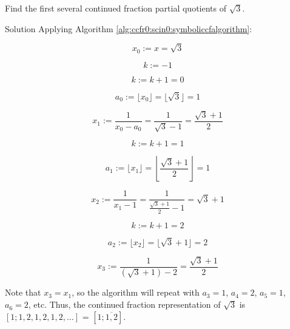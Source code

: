 \begin{vworkexamplestatement}
\label{ex:ccfr0:scin0:symboliccfalgorithmexample}
Find the first several continued fraction partial quotients of $\sqrt{3}$.
\end{vworkexamplestatement}
\begin{vworkexampleparsection}{Solution}
Applying Algorithm \ref{alg:ccfr0:scin0:symboliccfalgorithm}:

\begin{equation}
x_0 := x = \sqrt{3}
\end{equation}

\begin{equation}
k := -1
\end{equation}

\begin{equation}
k := k+1 = 0
\end{equation}

\begin{equation}
a_0 := \lfloor x_0 \rfloor = \lfloor \sqrt{3} \rfloor = 1
\end{equation}

\begin{equation}
x_1 := \frac{1}{x_0 - a_0}
    = \frac{1}{\sqrt{3}-1}
    = \frac{\sqrt{3}+1}{2}
\end{equation}

\begin{equation}
k := k + 1 = 1
\end{equation}

\begin{equation}
a_1 := \lfloor x_1 \rfloor = 
\left\lfloor {\frac{\sqrt{3}+1}{2}} \right\rfloor = 1
\end{equation}

\begin{equation}
x_2 := \frac{1}{x_1 - 1}
     = \frac{1}{\frac{\sqrt{3}+1}{2}-1}
     = \sqrt{3}+1
\end{equation}

\begin{equation}
k := k + 1 = 2
\end{equation}

\begin{equation}
a_2 := \lfloor x_2 \rfloor = \lfloor \sqrt{3}+1 \rfloor = 2
\end{equation}

\begin{equation}
x_3 := \frac{1}{(\sqrt{3}+1)-2} = \frac{\sqrt{3}+1}{2}
\end{equation}

Note that $x_3 = x_1$, so the algorithm will repeat with 
$a_3=1$, $a_4=2$, $a_5=1$, $a_6=2$, etc.  Thus, the continued
fraction representation of $\sqrt{3}$ is 
$[1;1,2,1,2,1,2, \ldots{}]$ = $[1;\overline{1,2}]$.
\end{vworkexampleparsection}
